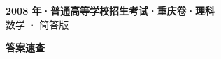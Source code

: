 \documentclass[zihao=-4, a4paper]{ctexart}
\begin{document}
\begin{center}
  {\Large\bfseries 2008 年·普通高等学校招生考试·重庆卷·理科}\\[4pt]
  {\large 数学 · 简答版}
\end{center}
\medskip
{}

\clearpage
{}
\begin{center}{\Large\bfseries 答案速查}\end{center}
\medskip

\end{document}
